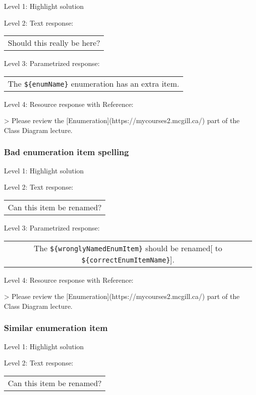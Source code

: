 \noindent Level 1: Highlight solution \medskip

\noindent Level 2: Text response: \medskip

\begin{tabular}{|c}
Should this really be here?
\end{tabular} \medskip

\noindent Level 3: Parametrized response: \medskip

\begin{tabular}{|c}
The \verb|${enumName}| enumeration has an extra item.
\end{tabular} \medskip

\noindent Level 4: Resource response with Reference:

> Please review the [Enumeration](https://mycourses2.mcgill.ca/) part of the Class Diagram lecture.


\subsubsection{Bad enumeration item spelling}

\noindent Level 1: Highlight solution \medskip

\noindent Level 2: Text response: \medskip

\begin{tabular}{|c}
Can this item be renamed?
\end{tabular} \medskip

\noindent Level 3: Parametrized response: \medskip

\begin{tabular}{|c}
The \verb|${wronglyNamedEnumItem}| should be renamed[ to \verb|${correctEnumItemName}|].
\end{tabular} \medskip

\noindent Level 4: Resource response with Reference:

> Please review the [Enumeration](https://mycourses2.mcgill.ca/) part of the Class Diagram lecture.


\subsubsection{Similar enumeration item}

\noindent Level 1: Highlight solution \medskip

\noindent Level 2: Text response: \medskip

\begin{tabular}{|c}
Can this item be renamed?
\end{tabular} \medskip

